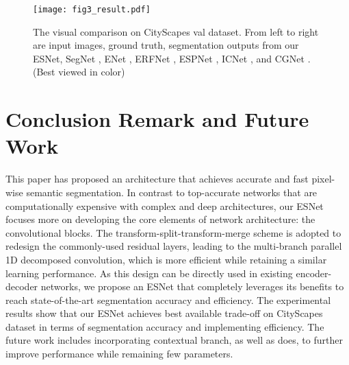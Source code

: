 \documentclass[runningheads]{llncs}
\begin{document}
\begin{figure*}[!t]
\centerline{\texttt{[image: fig3\_result.pdf]}}
\caption{The visual comparison on CityScapes val dataset. From left to right are input images, ground truth, segmentation outputs from our ESNet, SegNet \cite{Badrinarayanan2015Segnet}, ENet \cite{Paszke2016enet}, ERFNet \cite{Romera2018erfnet}, ESPNet \cite{Mehta2018espnet}, ICNet \cite{Zhao2018ICnet}, and CGNet \cite{wu2018cgnet}. (Best viewed in color)} \label{fig:Result3}
\end{figure*}

\section{Conclusion Remark and Future Work}\label{sec:Conclusion}

This paper has proposed an architecture that achieves accurate and fast pixel-wise semantic segmentation. In contrast to top-accurate networks that are computationally expensive with complex and deep architectures, our ESNet focuses more on developing the core elements of network architecture: the convolutional blocks. The transform-split-transform-merge scheme is adopted to redesign the commonly-used residual layers, leading to the multi-branch parallel 1D decomposed convolution, which is more efficient while retaining a similar learning performance. As this design can be directly used in existing encoder-decoder networks, we propose an ESNet that completely leverages its benefits to reach state-of-the-art segmentation accuracy and efficiency. The experimental results show that our ESNet achieves best available trade-off on CityScapes dataset in terms of segmentation accuracy and implementing efficiency. The future work includes incorporating contextual branch, as well as \cite{wu2018cgnet,yu2018bisenet} does, to further improve performance while remaining few parameters.









\end{document}
